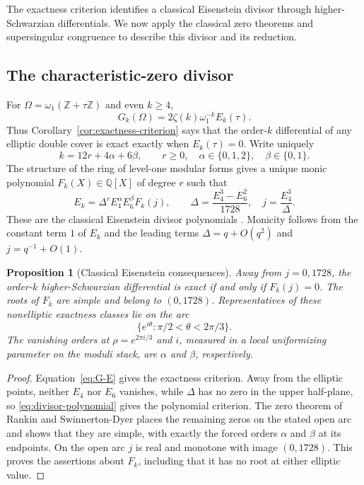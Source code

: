 \documentclass[11pt]{amsart}
\newtheorem{prop}[thm]{Proposition}
\theoremstyle{definition}
\theoremstyle{remark}
\numberwithin{equation}{section}
\begin{document}
The exactness criterion identifies a classical Eisenstein divisor
through higher-Schwarzian differentials. We now apply the classical
zero theorems and supersingular congruence to describe this divisor
and its reduction.

\subsection{The characteristic-zero divisor}

For $\Omega=\omega_1(\mathbb Z+\tau\mathbb Z)$ and even $k\geq4$,
\begin{equation}\label{eq:G-E}
G_k(\Omega)=2\zeta(k)\omega_1^{-k}E_k(\tau).
\end{equation}
Thus Corollary~\ref{cor:exactness-criterion} says that the order-$k$
differential of any elliptic double cover is exact exactly when
$E_k(\tau)=0$. Write uniquely
\[
k=12r+4\alpha+6\beta,\qquad r\geq0,\quad
\alpha\in\{0,1,2\},\quad\beta\in\{0,1\}.
\]
The structure of the ring of level-one modular forms gives a unique
monic polynomial $F_k(X)\in\mathbb Q[X]$ of degree $r$ such that
\begin{equation}\label{eq:divisor-polynomial}
E_k=\Delta^r E_4^\alpha E_6^\beta F_k(j),
\qquad
\Delta=\frac{E_4^3-E_6^2}{1728},\quad j=\frac{E_4^3}{\Delta}.
\end{equation}
These are the classical Eisenstein divisor polynomials
\cite[\S1]{kz-ss}. Monicity follows from the constant term $1$ of $E_k$
and the leading terms $\Delta=q+O(q^2)$ and $j=q^{-1}+O(1)$.

\begin{prop}[Classical Eisenstein consequences]\label{prop:exactness-divisor}
Away from $j=0,1728$, the order-$k$ higher-Schwarzian differential is
exact if and only if $F_k(j)=0$. The roots of $F_k$ are simple and
belong to $(0,1728)$. Representatives of these nonelliptic exactness
classes lie on the arc
\[
\{e^{i\theta}:\pi/2<\theta<2\pi/3\}.
\]
The vanishing orders at $\rho=e^{2\pi i/3}$ and $i$, measured in a
local uniformizing parameter on the moduli stack, are $\alpha$ and
$\beta$, respectively.
\end{prop}

\begin{proof}
Equation~\eqref{eq:G-E} gives the exactness criterion. Away from the
elliptic points, neither $E_4$ nor $E_6$ vanishes, while $\Delta$ has
no zero in the upper half-plane, so \eqref{eq:divisor-polynomial}
gives the polynomial criterion. The zero theorem of Rankin and
Swinnerton-Dyer \cite{rankin-swinnerton-dyer} places the remaining
zeros on the stated open arc and shows that they are simple, with
exactly the forced orders $\alpha$ and $\beta$ at its endpoints.
On the open arc $j$ is real and monotone with image $(0,1728)$.
This proves the assertions about $F_k$, including that it has no
root at either elliptic value.
\end{proof}
\end{document}
